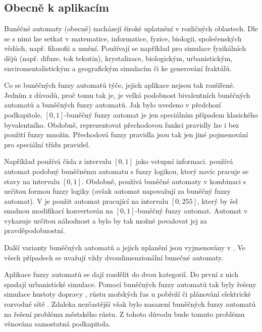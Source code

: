 \documentclass[a4paper,10pt]{article}
\begin{document}
\subsection{Obecně k aplikacím}
Buněčné automaty (obecně) nacházejí široké uplatnění v rozličných oblastech. Dle \cite{Wol-NewKinSci} se s nimi lze setkat v matematice, informatice, fyzice, biologii, společenských vědách, např. filozofii a umění. Používají se například pro simulace fyzikálních dějů (např. difuze, tok tekutin), krystalizace, biologickým, urbanistickým, enviromentalistickým a geografickým simulacím či ke generování fraktálů.

Co se buněčných fuzzy automatů týče, jejich aplikace nejsou tak rozšířené. Jedním z důvodů, proč tomu tak je, je velká podobnost bivalentních buněčných automatů a buněčných fuzzy automatů. Jak bylo uvedeno v předchozí podkapitole, $[0,1]$-buněčný fuzzy automat je jen speciálním případem klasického byvalentního. Obdobně, reprezentovat přechodovou funkci  pravidly lze i bez použití fuzzy množin. Přechodová fuzzy pravidla jsou tak jen jiné pojmenování pro speciální třídu pravidel.

Například \cite{WhiEngInj-UsConsCelAuHiResModUrbLanUsDyn} používá čísla z intervalu $[0,1]$ jako vstupní informaci. \cite{DiwPatGup-CelAutBasEdDetBraTum} používá automat podobný buněčnému automatu s fuzzy logikou, který navíc pracuje se stavy na intervalu $[0,1]$. Obdobně, \cite{PatMor-EdgDetTecFuzzLogCEllLeaAutFuzzImPro} používá buněčné automaty v kombinaci s určitou formou fuzzy logiky (avšak automat napovažují za buněčný fuzzy automat). V \cite{MofSadRezMey-CelEdDetComCelAuCelLeaAu} je použit automat pracující na intervalu $[0,255]$, který by šel snadnou modifikací konvertován na $[0,1]$-buněčný fuzzy automat. Automat v \cite{BatXie-CellCity} vykazuje určitou náhodnost a bylo by tak možné považovat jej za pravděpodobnostní.
  
Další varianty buněčných automatů a jejich uplanění jsou vyjmenovány v \cite{NayPatMah-SurTwDimCelAutAppImProc}. Ve všech případech se uvažují vždy dvoudimenzionální bunečné automaty.

Aplikace fuzzy automatů se dají rozdělit do dvou kategorií. Do první z nich spadají urbanistické simulace. Pomocí buněčných fuzzy automatů tak byly řešeny simulace hustoty dopravy \cite{Pla-FuzCelModTrafDatFus}, růstu mořských řas u pobřeží \cite{CheMyn-ModAlgBloDutCosWat+} či plánování elektrické rozvodné sítě \cite{CheMyn-ModAlgBloDutCosWat+}. Zdaleka nezčastější však bylo nasazení buněčných fuzzy automatů na řešení problému městského růstu. Z tohoto důvodu bude tomuto problému věnována samostatná podkapitola.
\end{document}

